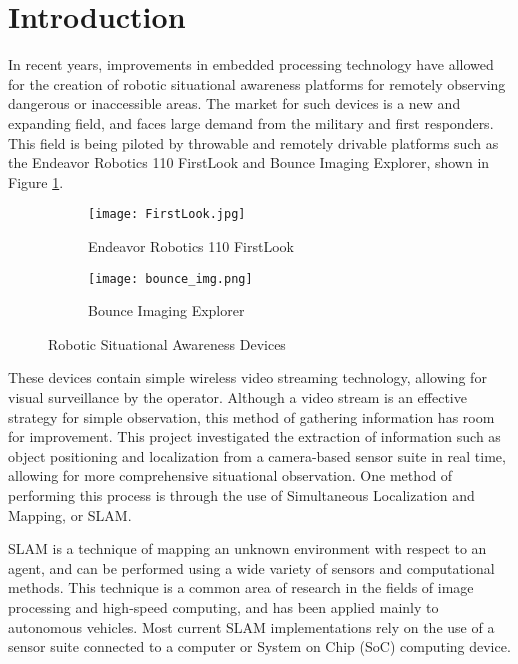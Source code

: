 \section{Introduction}
In recent years, improvements in embedded processing technology have allowed for the creation of robotic situational awareness platforms for remotely observing dangerous or inaccessible areas. The market for such devices is a new and expanding field, and faces large demand from the military and first responders. This field is being piloted by throwable and remotely drivable platforms such as the Endeavor Robotics 110 FirstLook and Bounce Imaging Explorer, shown in Figure \ref{robocop}. 

\par
\begin{figure}[H]
        \begin{subfigure}[h]{0.5\textwidth}
             \centerline{\texttt{[image: FirstLook.jpg]}}
            \caption{Endeavor Robotics 110 FirstLook \cite{endeavor}}
        \end{subfigure}
        \begin{subfigure}[h]{0.5\textwidth}
            \centerline{\texttt{[image: bounce\_img.png]}}
            \caption{Bounce Imaging Explorer \cite{bounceImaging}}
        \end{subfigure}
\caption{Robotic Situational Awareness Devices}
\label{robocop}
\end{figure}
\par
These devices contain simple wireless video streaming technology, allowing for visual surveillance by the operator. Although a video stream is an effective strategy for simple observation, this method of gathering information has room for improvement. This project investigated the extraction of information such as object positioning and localization from a camera-based sensor suite in real time, allowing for more comprehensive situational observation. One method of performing this process is through the use of Simultaneous Localization and Mapping, or SLAM. 
\par
SLAM is a technique of mapping an unknown environment with respect to an agent, and can be performed using a wide variety of sensors and computational methods. This technique is a common area of research in the fields of image processing and high-speed computing, and has been applied mainly to autonomous vehicles. Most current SLAM implementations rely on the use of a sensor suite connected to a computer or System on Chip (SoC) computing device. 
